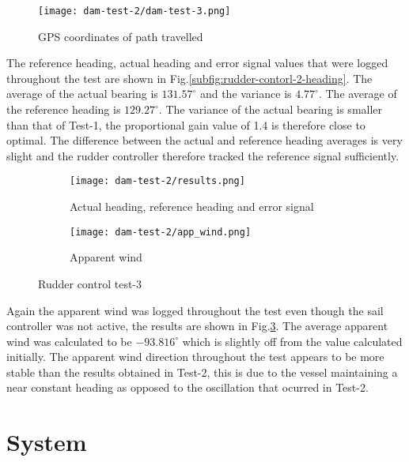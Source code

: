 \begin{figure}[h!]
    \centering
    \texttt{[image: dam-test-2/dam-test-3.png]}
    \caption[Path travelled in first rudder control test]{GPS coordinates of path travelled}
    \label{fig:rudder-control-test-2-path}
\end{figure}

The reference heading, actual heading and error signal values that were logged throughout the test are shown in Fig.\ref{subfig:rudder-contorl-2-heading}. 
The average of the actual bearing is $131.57^{\circ}$ and the variance is $4.77^{\circ}$. The average of the reference heading is
$129.27^{\circ}$. The variance of the actual bearing is smaller than that of Test-1, the proportional gain value of 1.4 is therefore close to optimal. The difference between the actual and reference 
heading averages is very slight and the rudder controller therefore tracked the reference signal sufficiently.

\begin{figure}[h!]
    \centering
    \begin{subfigure}{=0.75\linewidth}
        \centering
        \texttt{[image: dam-test-2/results.png]}
        \caption{Actual heading, reference heading and error signal}
        \label{subfig:rudder-control-2-heading}
    \end{subfigure}

    \begin{subfigure}{=0.75\linewidth}
        \centering
        \texttt{[image: dam-test-2/app\_wind.png]}
        \caption{Apparent wind}
        \label{subfig:rudder-control-2-wind}
    \end{subfigure}

    \caption[Rudder control test-3]{Rudder control test-3}
    \label{fig:rudder-control-2-water}
\end{figure}

Again the apparent wind was logged throughout the test even though the sail 
controller was not active, the results are shown in Fig.\ref{subfig:rudder-control-2-wind}. The average apparent wind was calculated to be $-93.816^{\circ}$ which is slightly off from the value 
calculated initially. The apparent wind direction throughout the test appears to be more stable than the results obtained in Test-2, this is due to the vessel maintaining a near constant heading
as opposed to the oscillation that ocurred in Test-2.


\section{System}

